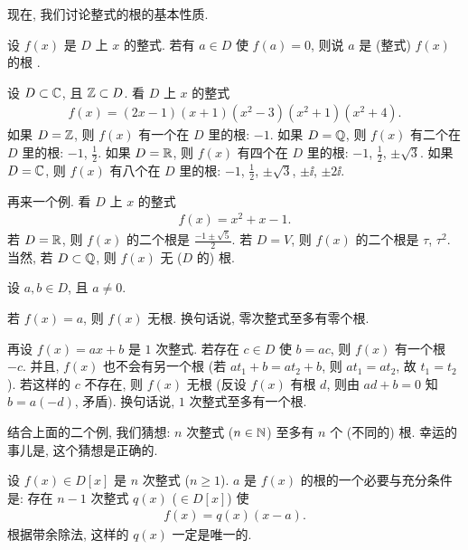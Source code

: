 现在, 我们讨论整式的根的基本性质.

\begin{definition}
    设 $f(x)$ 是 $D$ 上 $x$ 的整式. 若有 $a \in D$ 使 $f(a) = 0$, 则说 $a$ 是 (整式) $f(x)$ 的根 .
\end{definition}

\begin{example}
    设 $D \subset \mathbb{C}$, 且 $\mathbb{Z} \subset D$. 看 $D$ 上 $x$ 的整式
    \begin{align*}
        f(x) = (2x-1)(x+1)(x^2 - 3)(x^2 + 1)(x^2 + 4).
    \end{align*}
    如果 $D = \mathbb{Z}$, 则 $f(x)$ 有一个在 $D$ 里的根: $-1$. 如果 $D = \mathbb{Q}$, 则 $f(x)$ 有二个在 $D$ 里的根: $-1$, $\frac12$. 如果 $D = \mathbb{R}$, 则 $f(x)$ 有四个在 $D$ 里的根: $-1$, $\frac12$, $\pm \sqrt{3}$. 如果 $D = \mathbb{C}$, 则 $f(x)$ 有八个在 $D$ 里的根: $-1$, $\frac12$, $\pm \sqrt{3}$, $\pm \ii$, $\pm 2\ii$.
\end{example}

\begin{example}
    再来一个例. 看 $D$ 上 $x$ 的整式
    \begin{align*}
        f(x) = x^2 + x - 1.
    \end{align*}
    若 $D = \mathbb{R}$, 则 $f(x)$ 的二个根是 $\frac{-1 \pm \sqrt{5}}{2}$. 若 $D = V$, 则 $f(x)$ 的二个根是 $\tau$, $\tau^2$. 当然, 若 $D \subset \mathbb{Q}$, 则 $f(x)$ 无 ($D$ 的) 根.
\end{example}

\begin{remark}
    设 $a,b \in D$, 且 $a \neq 0$.

    若 $f(x) = a$, 则 $f(x)$ 无根. 换句话说, 零次整式至多有零个根.

    再设 $f(x) = ax + b$ 是 $1$ 次整式. 若存在 $c \in D$ 使 $b = ac$, 则 $f(x)$ 有一个根 $-c$. 并且, $f(x)$ 也不会有另一个根 (若 $at_1 + b = at_2 + b$, 则 $at_1 = at_2$, 故 $t_1 = t_2$). 若这样的 $c$ 不存在, 则 $f(x)$ 无根 (反设 $f(x)$ 有根 $d$, 则由 $ad + b = 0$ 知 $b = a(-d)$, 矛盾). 换句话说, $1$ 次整式至多有一个根.

    结合上面的二个例, 我们猜想: $n$ 次整式 ($n \in \mathbb{N}$) 至多有 $n$ 个 (不同的) 根. 幸运的事儿是, 这个猜想是正确的.
\end{remark}

\begin{proposition}
    设 $f(x) \in D[x]$ 是 $n$ 次整式 ($n \geq 1$). $a$ 是 $f(x)$ 的根的一个必要与充分条件是: 存在 $n-1$ 次整式 $q(x)$ ($\in D[x]$) 使
    \begin{align*}
        f(x) = q(x) (x-a).
    \end{align*}
    根据带余除法, 这样的 $q(x)$ 一定是唯一的.
\end{proposition}

